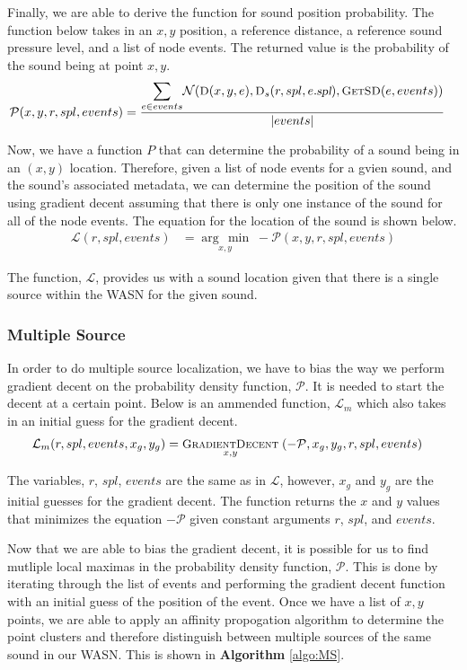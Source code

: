 \documentclass[12pt]{article}
\newcommand{\Normal}[3]{\mathcal{N}(#1, #2, #3)}
\newcommand{\Function}[1]{\ensuremath{{\small \textsc{#1}}}}
\newcommand{\Var}[1]{\ensuremath{{\small{\textsl{#1}}}}}
\newcommand{\argmin}[1]{\underset{#1}{\operatorname{arg}\,\operatorname{min}}\;}
\newcommand{\grad}[1]{\underset{#1}{\operatorname{\Function{GradientDecent}}}\;}
\begin{document}
Finally, we are able to derive the function for sound position probability. The
function below takes in an $x, y$ position, a reference distance, a reference
sound pressure level, and a list of node events. The returned value is the
probability of the sound being at point $x, y$.  \begin{align*} \mathcal{P}(x,
y, r, spl, events) &= \frac{\mathlarger{\sum}_{e \in
events}{\Normal{\Function{D}(x, y, e)}{\Function{D}_{s}(r, spl,
e.\Var{spl})}{\Function{GetSD}(e, events)}}}{|events|} \end{align*}

Now, we have a function $P$ that can determine the probability of a sound being
in an $(x, y)$ location. Therefore, given a list of node events for a gvien
sound, and the sound's associated metadata, we can determine the position of
the sound using gradient decent assuming that there is only one instance of the
sound for all of the node events. The equation for the location of the sound is
shown below. \begin{align*} \mathcal{L}(r, spl, events) &= \argmin{x, y}
-\mathcal{P}(x, y, r, spl, events) \end{align*}

The function, $\mathcal{L}$, provides us with a sound location given that there
is a single source within the WASN for the given sound.

\subsubsection{Multiple Source}

In order to do multiple source localization, we have to bias the way we perform
gradient decent on the probability density function, $\mathcal{P}$. It is
needed to start the decent at a certain point. Below is an ammended function,
$\mathcal{L}_m$ which also takes in an initial guess for the gradient decent.
\begin{align*} \mathcal{L}_m(r, spl, events, x_g, y_g) &=
\grad{x, y}(\mathcal{-P}, x_g, y_g, r, spl, events) \end{align*}

The variables, $r$, $spl$, $events$ are the same as in $\mathcal{L}$, however,
$x_g$ and $y_g$ are the initial guesses for the gradient decent. The function
returns the $x$ and $y$ values that minimizes the equation $-\mathcal{P}$ given
constant arguments $r$, $spl$, and $events$.

Now that we are able to bias the gradient decent, it is possible for us to find
mutliple local maximas in the probability density function, $\mathcal{P}$. This
is done by iterating through the list of events and performing the gradient
decent function with an initial guess of the position of the event. Once we
have a list of $x, y$ points, we are able to apply an affinity propogation
algorithm to determine the point clusters and therefore distinguish between
multiple sources of the same sound in our WASN. This is shown in
\textbf{Algorithm} \ref{algo:MS}.
\end{document}
